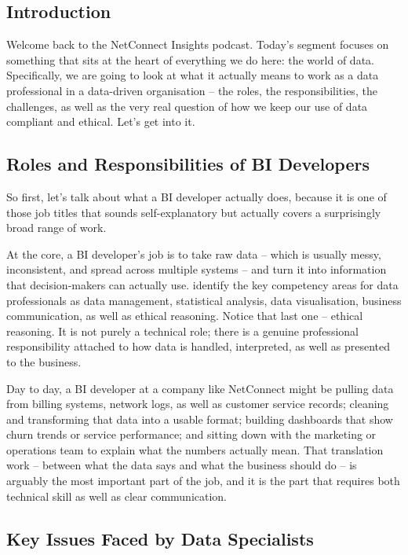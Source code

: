 \documentclass[12pt,a4paper]{article}
\begin{document}
\subsection{Introduction}

Welcome back to the NetConnect Insights podcast. Today's segment focuses on something that sits at the heart of everything we do here: the world of data. Specifically, we are going to look at what it actually means to work as a data professional in a data-driven organisation -- the roles, the responsibilities, the challenges, as well as the very real question of how we keep our use of data compliant and ethical. Let's get into it.

\subsection{Roles and Responsibilities of BI Developers}

So first, let's talk about what a BI developer actually does, because it is one of those job titles that sounds self-explanatory but actually covers a surprisingly broad range of work.

At the core, a BI developer's job is to take raw data -- which is usually messy, inconsistent, and spread across multiple systems -- and turn it into information that decision-makers can actually use. \textcite{Collier2024} identify the key competency areas for data professionals as data management, statistical analysis, data visualisation, business communication, as well as ethical reasoning. Notice that last one -- ethical reasoning. It is not purely a technical role; there is a genuine professional responsibility attached to how data is handled, interpreted, as well as presented to the business.

Day to day, a BI developer at a company like NetConnect might be pulling data from billing systems, network logs, as well as customer service records; cleaning and transforming that data into a usable format; building dashboards that show churn trends or service performance; and sitting down with the marketing or operations team to explain what the numbers actually mean. That translation work -- between what the data says and what the business should do -- is arguably the most important part of the job, and it is the part that requires both technical skill as well as clear communication.

\subsection{Key Issues Faced by Data Specialists}
\end{document}
